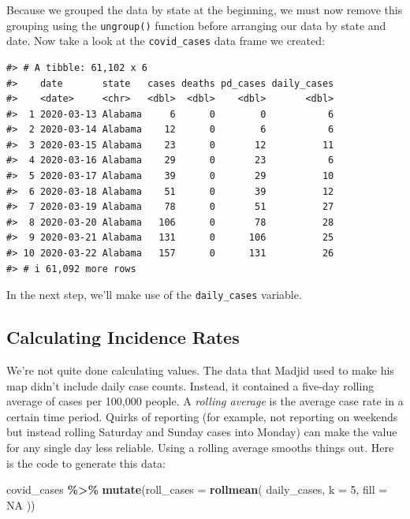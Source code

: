 \documentclass[
]{book}
\newenvironment{Shaded}{\begin{snugshade}}{\end{snugshade}}
\newcommand{\AttributeTok}[1]{\textcolor[rgb]{0.13,0.29,0.53}{#1}}
\newcommand{\ConstantTok}[1]{\textcolor[rgb]{0.56,0.35,0.01}{#1}}
\newcommand{\DecValTok}[1]{\textcolor[rgb]{0.00,0.00,0.81}{#1}}
\newcommand{\FunctionTok}[1]{\textcolor[rgb]{0.13,0.29,0.53}{\textbf{#1}}}
\newcommand{\NormalTok}[1]{#1}
\newcommand{\SpecialCharTok}[1]{\textcolor[rgb]{0.81,0.36,0.00}{\textbf{#1}}}
\begin{document}
Because we grouped the data by state at the beginning, we must now remove this grouping using the \texttt{ungroup()} function before arranging our data by state and date. Now take a look at the \texttt{covid\_cases} data frame we created:

\begin{verbatim}
#> # A tibble: 61,102 x 6
#>    date       state   cases deaths pd_cases daily_cases
#>    <date>     <chr>   <dbl>  <dbl>    <dbl>       <dbl>
#>  1 2020-03-13 Alabama     6      0        0           6
#>  2 2020-03-14 Alabama    12      0        6           6
#>  3 2020-03-15 Alabama    23      0       12          11
#>  4 2020-03-16 Alabama    29      0       23           6
#>  5 2020-03-17 Alabama    39      0       29          10
#>  6 2020-03-18 Alabama    51      0       39          12
#>  7 2020-03-19 Alabama    78      0       51          27
#>  8 2020-03-20 Alabama   106      0       78          28
#>  9 2020-03-21 Alabama   131      0      106          25
#> 10 2020-03-22 Alabama   157      0      131          26
#> # i 61,092 more rows
\end{verbatim}

In the next step, we'll make use of the \texttt{daily\_cases} variable.

\hypertarget{calculating-incidence-rates}{%
\subsection*{Calculating Incidence Rates}\label{calculating-incidence-rates}}

We're not quite done calculating values. The data that Madjid used to make his map didn't include daily case counts. Instead, it contained a five-day rolling average of cases per 100,000 people. A \emph{rolling average} is the average case rate in a certain time period. Quirks of reporting (for example, not reporting on weekends but instead rolling Saturday and Sunday cases into Monday) can make the value for any single day less reliable. Using a rolling average smooths things out. Here is the code to generate this data:

\begin{Shaded}
\begin{Highlighting}[]
\NormalTok{covid\_cases }\SpecialCharTok{\%\textgreater{}\%}
  \FunctionTok{mutate}\NormalTok{(}\AttributeTok{roll\_cases =} \FunctionTok{rollmean}\NormalTok{(}
\NormalTok{    daily\_cases,}
    \AttributeTok{k =} \DecValTok{5}\NormalTok{,}
    \AttributeTok{fill =} \ConstantTok{NA}
\NormalTok{  ))}
\end{Highlighting}
\end{Shaded}
\end{document}
